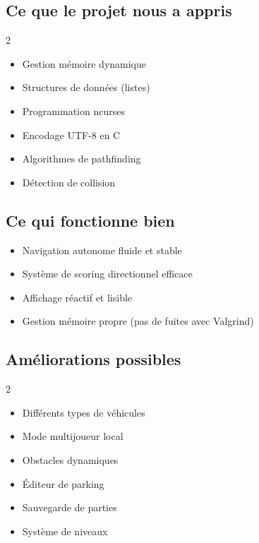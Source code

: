 \documentclass[11pt,a4paper]{article}
\begin{document}
\subsection{Ce que le projet nous a appris}

\begin{multicols}{2}
\begin{itemize}[leftmargin=*]
    \item[\faIcon{memory}] Gestion mémoire dynamique
    \item[\faIcon{project-diagram}] Structures de données (listes)
    \item[\faIcon{terminal}] Programmation ncurses
    \item[\faIcon{globe}] Encodage UTF-8 en C
    \item[\faIcon{route}] Algorithmes de pathfinding
    \item[\faIcon{car-crash}] Détection de collision
\end{itemize}
\end{multicols}

\subsection{Ce qui fonctionne bien}

\begin{successbox}
\begin{itemize}[noitemsep]
    \item Navigation autonome fluide et stable
    \item Système de scoring directionnel efficace
    \item Affichage réactif et lisible
    \item Gestion mémoire propre (pas de fuites avec Valgrind)
\end{itemize}
\end{successbox}

\subsection{Améliorations possibles}

\begin{infobox}
\begin{multicols}{2}
\begin{itemize}[noitemsep]
    \item Différents types de véhicules
    \item Mode multijoueur local
    \item Obstacles dynamiques
    \item Éditeur de parking
    \item Sauvegarde de parties
    \item Système de niveaux
\end{itemize}
\end{multicols}
\end{infobox}
\end{document}
